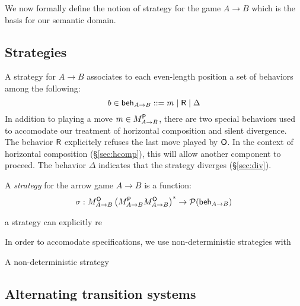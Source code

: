 We now formally define the notion of strategy
for the game $A \rightarrow B$
which is the basis for our semantic domain.

\subsection{Strategies}

%
%

A strategy for $A \rightarrow B$
associates to each even-length position
a set of behaviors among the following:
\[
    b \in  \mathsf{beh} _{A \rightarrow B} ::= m \mid  \mathsf{R}  \mid \Delta
\]
In addition to playing a move $m \in M_{A \rightarrow B}^{ \mathsf{P} }$,
there are two special behaviors
used to accomodate our treatment of
horizontal composition and silent divergence.
The behavior $ \mathsf{R} $ explicitely refuses the last move played by $ \mathsf{O} $.
In the context of horizontal composition (\S\ref{sec:hcomp}),
this will allow another component to proceed.
The behavior $\Delta$ indicates that the strategy diverges (\S\ref{sec:div}).

\begin{definition}
A \emph{strategy} for the arrow game $A \rightarrow B$
is a function:
\[
    \sigma :
      M_{A \rightarrow B}^{ \mathsf{O} }
      \left( M_{A \rightarrow B}^{ \mathsf{P} } M_{A \rightarrow B}^{ \mathsf{O} } \right)^*
      \rightarrow
      \mathcal{P}( \mathsf{beh} _{A \rightarrow B})
\]
\end{definition}


a strategy can explicitly re


In order to accomodate specifications,
we use non-deterministic strategies with 

A non-deterministic strategy 


\subsection{Alternating transition systems}

